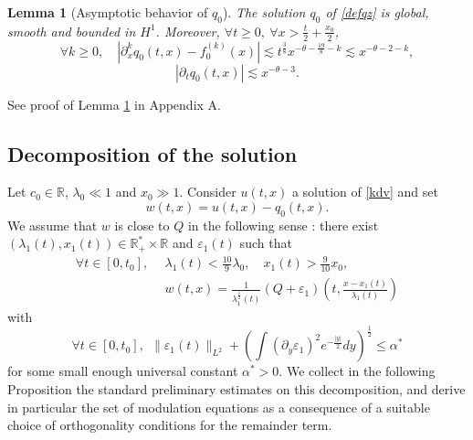 \documentclass[11pt,a4paper,reqno]{amsart}
\newtheorem{lemma}[theorem]{Lemma}
\theoremstyle{remark}
\numberwithin{equation}{section}
\newcommand{\be}{\begin{equation}}
\newcommand{\ee}{\end{equation}}
\def\RR{\mathbb{R}}
\def\RR{\mathbb{R}}
\def\e{\varepsilon}
\def\l{\lambda}
\def\qz{q_0}
\begin{document}
\begin{lemma}[Asymptotic behavior of $\qz$]\label{le:qz}
The solution $\qz$ of \eqref{defqz} is global, smooth and bounded  in $H^1$.
Moreover, $\forall t\geq 0,\  \forall x>\frac t 2+\frac {x_0}2$,
\be\label{leqz3}
\forall k\geq 0,\quad
|\partial_x^k \qz(t,x) -f_0^{(k)}(x) | \lesssim   t^{\frac 38} x^{-\theta-\frac {19}8 - k }
\lesssim x^{-\theta-2 - k }, 
\ee
\be\label{leqz4}
|\partial_t\qz(t,x) | \lesssim  x^{-\theta-3}
.
\ee
\end{lemma}
See proof of Lemma \ref{le:qz} in Appendix A.

\subsection{Decomposition of the solution}

Let $c_0\in \RR$, $\l_0\ll 1$ and $x_0\gg 1$. Consider $u(t,x)$ a solution of \eqref{kdv} and set
\be\label{defw}
w(t,x)= u(t,x) - \qz(t,x).
\ee
We assume that $w$ is close to $Q$ in the following sense : there exist $(\lambda_1(t),x_1(t))\in \RR^*_+\times \RR$ and $\e_1(t)$ such that
\begin{align}\label{decompo0}
\forall t\in [0,t_0], \ \ &
\l_1(t)<\frac {10}9 \l_0,\quad x_1(t)> \frac 9{10} x_0,
\\  \label{decompo1}
& w(t,x)=\frac{1}{\lambda^{\frac 12}_1(t)}(Q+\e_1)\left(t,\frac{x-x_1(t)}{\lambda_1(t)}\right)
\end{align}
with 
\be
\label{hypeprochien}
\forall t\in [0,t_0],\ \
 \|\e_1(t)\|_{L^2}+\left(\int (\partial_y \e_1)^2 e^{-\frac {|y|}{2}} dy \right)^{\frac 12}\leq \alpha^*
\ee
for some small enough universal constant $\alpha^*>0$. We collect in the following Proposition the standard preliminary estimates on this decomposition, and derive in particular the set of modulation equations as a consequence of a suitable choice of orthogonality conditions for the remainder term.
\end{document}
